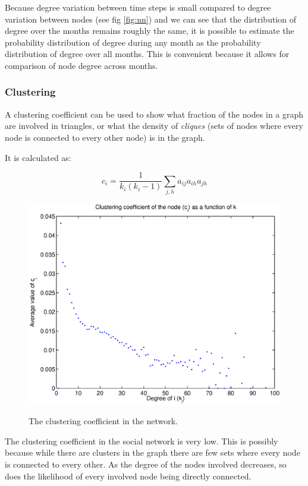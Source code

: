 \documentclass[12pt]{article}
\begin{document}
Because degree variation between time steps is small compared to degree variation between nodes (see fig \ref{fig:nn}) and we can see that the distribution of degree over the months remains roughly the same, it is possible to estimate the probability distribution of degree during any month as the probability distribution of degree over all months. This is convenient because it allows for comparison of node degree across months.

\subsubsection*{Clustering}

A clustering coefficient can be used to show what fraction of the nodes in a graph are involved in triangles, or what the density of \emph{cliques} (sets of nodes where every node is connected to every other node) is in the graph.

It is calculated as:

\begin{equation}
c_i = \frac{1}{k_i(k_i-1)}\sum_{j,h} a_{ij}a_{ih}a_{jh}
\end{equation}

\begin{figure}[H]
\includegraphics[trim = 0cm 0cm 0cm 0cm, width = .9\textwidth]{Graficos/clusteringcoeff.eps}
\label{fig:cluster}
\caption{The clustering coefficient in the network.}
\end{figure}

The clustering coefficient in the social network is very low. This is possibly because while there are clusters in the graph there are few sets where every node is connected to every other. As the degree of the nodes involved decreases, so does the likelihood of every involved node being directly connected.
\end{document}
